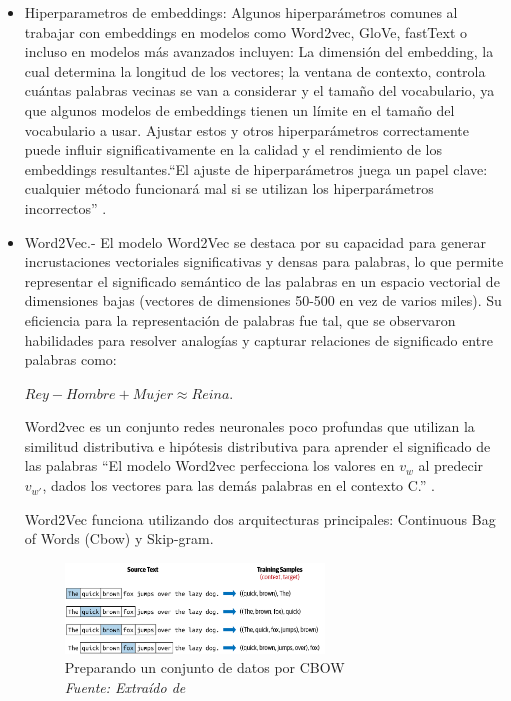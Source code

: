 \begin{itemize}
\begin{itemize}
	\item Hiperparametros de embeddings: Algunos hiperparámetros comunes al trabajar con embeddings en modelos como Word2vec, GloVe, fastText o incluso en modelos más avanzados incluyen:  La dimensión del embedding, la cual  determina la longitud de los vectores; la ventana de contexto, controla cuántas palabras vecinas se van a considerar y el tamaño del vocabulario, ya que algunos modelos de embeddings tienen un límite en el tamaño del vocabulario a usar. Ajustar estos y otros  hiperparámetros correctamente puede influir significativamente en la calidad y el rendimiento de los embeddings resultantes.``El ajuste de hiperparámetros juega un papel clave: cualquier método funcionará mal si se utilizan los hiperparámetros incorrectos'' \cite[p. 339]{eisenstein2018natural}.
	
	\item Word2Vec.- El modelo Word2Vec se destaca por su capacidad para generar incrustaciones vectoriales significativas y densas para palabras, lo que permite representar el significado semántico de las palabras en un espacio vectorial de dimensiones bajas (vectores de dimensiones 50-500 en vez de varios miles). Su eficiencia para la representación de palabras fue tal, que se observaron habilidades para resolver analogías y capturar relaciones de significado entre palabras como:  
	\begin{Center}
			$Rey - Hombre + Mujer \approx  Reina$.
	\end{Center}

	
Word2vec es un conjunto redes neuronales poco profundas que utilizan la similitud distributiva e hipótesis distributiva para aprender  el significado de las palabras ``El modelo Word2vec perfecciona los valores en $v_w$ al predecir $v_{w'}$, dados los vectores para las demás palabras en el contexto C.'' \cite[p. 95]{vajjala2020practical} .

Word2Vec funciona utilizando dos arquitecturas principales: Continuous Bag of Words (Cbow) y Skip-gram.

\begin{figure}[h!]
	\includegraphics[width=0.65\textwidth]{capitulo3/figuras/nlp3.png}
	\caption{Preparando un conjunto de datos por CBOW
		\\\textit{Fuente: Extraído de} \protect\cite[p. 99]{vajjala2020practical}}
	\label{fig:nlp3}
\end{figure}


\end{itemize}
\end{itemize}
